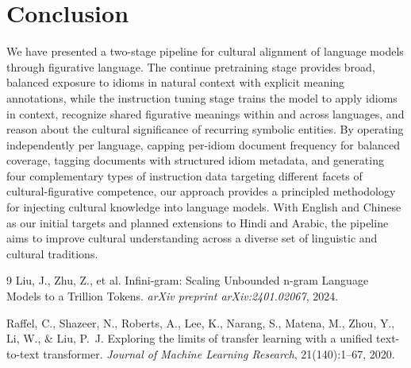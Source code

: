\documentclass[11pt,a4paper]{article}
\begin{document}
\section{Conclusion}

We have presented a two-stage pipeline for cultural alignment of language models through figurative language. The continue pretraining stage provides broad, balanced exposure to idioms in natural context with explicit meaning annotations, while the instruction tuning stage trains the model to apply idioms in context, recognize shared figurative meanings within and across languages, and reason about the cultural significance of recurring symbolic entities. By operating independently per language, capping per-idiom document frequency for balanced coverage, tagging documents with structured idiom metadata, and generating four complementary types of instruction data targeting different facets of cultural-figurative competence, our approach provides a principled methodology for injecting cultural knowledge into language models. With English and Chinese as our initial targets and planned extensions to Hindi and Arabic, the pipeline aims to improve cultural understanding across a diverse set of linguistic and cultural traditions.


\begin{thebibliography}{9}
Liu, J., Zhu, Z., et al.
\newblock Infini-gram: Scaling Unbounded n-gram Language Models to a Trillion Tokens.
\newblock \textit{arXiv preprint arXiv:2401.02067}, 2024.

Raffel, C., Shazeer, N., Roberts, A., Lee, K., Narang, S., Matena, M., Zhou, Y., Li, W., \& Liu, P.~J.
\newblock Exploring the limits of transfer learning with a unified text-to-text transformer.
\newblock \textit{Journal of Machine Learning Research}, 21(140):1--67, 2020.
\end{thebibliography}
\end{document}
